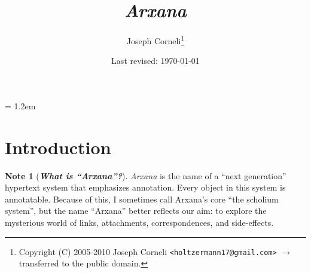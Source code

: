 \theoremstyle{definition}
\newtheorem{nota}{Note}[section]

\parindent = 1.2em

\newenvironment{notate}[1]
  {\begin{nota}[{\bf {\em #1}}]}%
  {\end{nota}}

\makeatletter
\newenvironment{elisp}
  {\let\ORGverbatim@font\verbatim@font
   \def\verbatim@font{\ttfamily\scshape}%
   \verbatim}
  {\endverbatim
  \let\verbatim@font\ORGverbatim@font}
\makeatother

\makeatletter
\newenvironment{common}[1]
  {\let\ORGverbatim@font\verbatim@font
   \def\verbatim@font{\ttfamily\scshape}%
   \verbatim}
  {\endverbatim
  \let\verbatim@font\ORGverbatim@font}
\makeatother

\makeatletter
\newenvironment{idea}
  {\let\ORGverbatim@font\verbatim@font
   \def\verbatim@font{\ttfamily\slshape}%
   \verbatim}
  {\endverbatim
  \let\verbatim@font\ORGverbatim@font}
\makeatother



\title{\emph{Arxana}}

\author{Joseph Corneli\thanks{Copyright (C) 2005-2010
    Joseph Corneli {\tt <holtzermann17@gmail.com>}\newline
    $\longrightarrow$ transferred to the public domain.}}
\date{Last revised: \today}

\maketitle


\tableofcontents

\section{Introduction}

\begin{notate}{What is ``Arxana''?} \label{arxana}
\emph{Arxana} is the name of a ``next generation''
hypertext system that emphasizes annotation.  Every object
in this system is annotatable.  Because of this, I
sometimes call Arxana's core ``the scholium system'', but
the name ``Arxana'' better reflects our aim: to explore
the mysterious world of links, attachments,
correspondences, and side-effects.
\end{notate}

